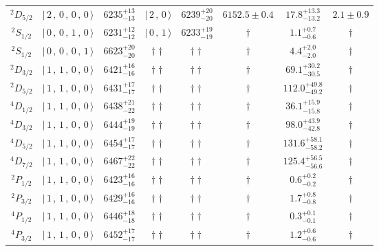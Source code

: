 \begin{tabular}{c| c c c c c c c}
$^{2}D_{5/2}$ & $\vert \,2\,,\,0\,,\,0\,,\,0 \,\rangle $ & $6235^{+13}_{-13}$ & $\vert \,2\,,\,0 \,\rangle$ & $6239^{+20}_{-20}$ & $6152.5\pm 0.4$ & $17.8^{+13.3}_{-13.2}$ & $2.1\pm 0.9$ \\ 
$^{2}S_{1/2}$ & $\vert \,0\,,\,0\,,\,1\,,\,0 \,\rangle $ & $6231^{+12}_{-12}$ & $\vert \,0\,,\,1 \,\rangle$ & $6233^{+19}_{-19}$ & $\dagger$ & $1.1^{+0.7}_{-0.6}$ & $\dagger$ \\ 
$^{2}S_{1/2}$ & $\vert \,0\,,\,0\,,\,0\,,\,1 \,\rangle $ & $6623^{+20}_{-20}$ & $\dagger\dagger$ & $\dagger\dagger$ & $\dagger$ & $4.4^{+2.0}_{-2.0}$ & $\dagger$ \\ 
$^{2}D_{3/2}$ & $\vert \,1\,,\,1\,,\,0\,,\,0 \,\rangle $ & $6421^{+16}_{-16}$ & $\dagger\dagger$ & $\dagger\dagger$ & $\dagger$ & $69.1^{+30.2}_{-30.5}$ & $\dagger$ \\ 
$^{2}D_{5/2}$ & $\vert \,1\,,\,1\,,\,0\,,\,0 \,\rangle $ & $6431^{+17}_{-17}$ & $\dagger\dagger$ & $\dagger\dagger$ & $\dagger$ & $112.0^{+49.8}_{-49.2}$ & $\dagger$ \\ 
$^{4}D_{1/2}$ & $\vert \,1\,,\,1\,,\,0\,,\,0 \,\rangle $ & $6438^{+21}_{-22}$ & $\dagger\dagger$ & $\dagger\dagger$ & $\dagger$ & $36.1^{+15.9}_{-15.8}$ & $\dagger$ \\ 
$^{4}D_{3/2}$ & $\vert \,1\,,\,1\,,\,0\,,\,0 \,\rangle $ & $6444^{+19}_{-19}$ & $\dagger\dagger$ & $\dagger\dagger$ & $\dagger$ & $98.0^{+43.9}_{-42.8}$ & $\dagger$ \\ 
$^{4}D_{5/2}$ & $\vert \,1\,,\,1\,,\,0\,,\,0 \,\rangle $ & $6454^{+17}_{-17}$ & $\dagger\dagger$ & $\dagger\dagger$ & $\dagger$ & $131.6^{+58.1}_{-58.2}$ & $\dagger$ \\ 
$^{4}D_{7/2}$ & $\vert \,1\,,\,1\,,\,0\,,\,0 \,\rangle $ & $6467^{+22}_{-22}$ & $\dagger\dagger$ & $\dagger\dagger$ & $\dagger$ & $125.4^{+56.5}_{-56.6}$ & $\dagger$ \\ 
$^{2}P_{1/2}$ & $\vert \,1\,,\,1\,,\,0\,,\,0 \,\rangle $ & $6423^{+16}_{-16}$ & $\dagger\dagger$ & $\dagger\dagger$ & $\dagger$ & $0.6^{+0.2}_{-0.2}$ & $\dagger$ \\ 
$^{2}P_{3/2}$ & $\vert \,1\,,\,1\,,\,0\,,\,0 \,\rangle $ & $6429^{+16}_{-16}$ & $\dagger\dagger$ & $\dagger\dagger$ & $\dagger$ & $1.7^{+0.8}_{-0.8}$ & $\dagger$ \\ 
$^{4}P_{1/2}$ & $\vert \,1\,,\,1\,,\,0\,,\,0 \,\rangle $ & $6446^{+18}_{-18}$ & $\dagger\dagger$ & $\dagger\dagger$ & $\dagger$ & $0.3^{+0.1}_{-0.1}$ & $\dagger$ \\ 
$^{4}P_{3/2}$ & $\vert \,1\,,\,1\,,\,0\,,\,0 \,\rangle $ & $6452^{+17}_{-17}$ & $\dagger\dagger$ & $\dagger\dagger$ & $\dagger$ & $1.2^{+0.6}_{-0.6}$ & $\dagger$ \\ 

\end{tabular}
